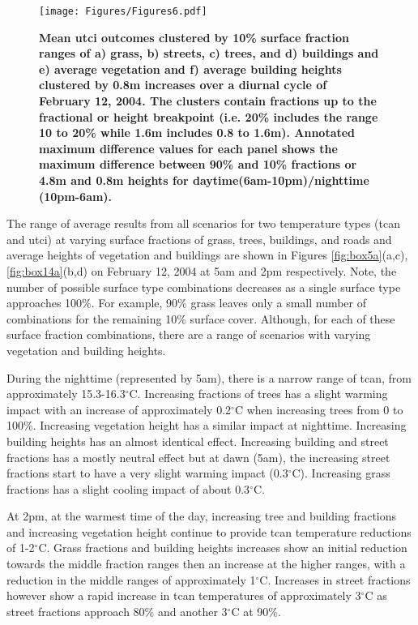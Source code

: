 \documentclass[final,3p,times,authoryear]{elsarticle}
\begin{document}
\begin{figure}
\centering
\texttt{[image: Figures/Figures6.pdf]}
\caption{\bf Mean \gls{utci} outcomes clustered by 10\% surface fraction ranges of a) grass, b) streets, c) trees, and d) buildings and e) average vegetation and f) average building heights clustered by 0.8m increases over a diurnal cycle of February 12, 2004. The clusters contain fractions up to the fractional or height breakpoint (i.e. 20\% includes the range 10 to 20\%  while 1.6m includes 0.8 to 1.6m). Annotated maximum difference values for each panel shows the maximum difference between 90\% and 10\% fractions or 4.8m and 0.8m heights for daytime(6am-10pm)/nighttime (10pm-6am).}
 \label{fig:utciday}
\end{figure}


The range of average results from all scenarios for two temperature types (\gls{tcan} and \gls{utci}) at varying surface fractions of grass, trees, buildings, and roads and average heights of vegetation and buildings are shown in Figures \ref{fig:box5a}(a,c), \ref{fig:box14a}(b,d) on February 12, 2004 at 5am and 2pm respectively. Note, the number of possible surface type combinations decreases as a single surface type approaches 100\%. For example, 90\% grass leaves only a small number of combinations for the remaining 10\% surface cover. Although, for each of these surface fraction combinations, there are a range of scenarios with varying vegetation and building heights.

During the nighttime (represented by 5am), there is a narrow range of \gls{tcan}, from approximately 15.3-16.3$^{\circ}$C. Increasing fractions of trees has a slight warming impact with an increase of approximately 0.2$^{\circ}$C when increasing trees from 0 to 100\%. Increasing vegetation height has a similar impact at nighttime. Increasing building heights has an almost identical effect. Increasing building and street fractions has a mostly neutral effect but at dawn (5am), the increasing street fractions start to have a very slight warming impact (0.3$^{\circ}$C). Increasing grass fractions has a slight cooling impact of about 0.3$^{\circ}$C.

At 2pm, at the warmest time of the day, increasing tree and building fractions and increasing vegetation height continue to provide \gls{tcan} temperature reductions of 1-2$^{\circ}$C. Grass fractions and building heights increases show an initial reduction towards the middle fraction ranges then an increase at the higher ranges, with a reduction in the middle ranges of approximately 1$^{\circ}$C. Increases in street fractions however show a rapid increase in \gls{tcan} temperatures of approximately 3$^{\circ}$C as street fractions approach 80\% and another 3$^{\circ}$C at 90\%.
\end{document}
